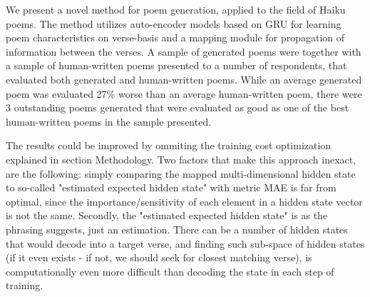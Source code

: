 \documentclass{acm_proc_article-sp}
\begin{document}
We present a novel method for poem generation, applied to the field of Haiku poems. The method utilizes auto-encoder models based on GRU for learning poem characteristics on verse-basis and a mapping module for propagation of information between the verses. A sample of generated poems were together with a sample of human-written poems presented to a number of respondents, that evaluated both generated and human-written poems. While an average generated poem was evaluated 27\% worse than an average human-written poem, there were 3 outstanding poems generated that were evaluated as good as one of the best human-written poems in the sample presented.

The results could be improved by ommiting the training cost optimization explained in section Methodology. Two factors that make this approach inexact, are the following: simply comparing the mapped multi-dimensional hidden state to so-called "estimated expected hidden state" with metric MAE is far from optimal, since the importance/sensitivity of each element in a hidden state vector is not the same. Secondly, the "estimated expected hidden state" is as the phrasing suggests, just an estimation. There can be a number of hidden states that would decode into a target verse, and finding such sub-space of hidden states (if it even exists - if not, we should seek for closest matching verse), is computationally even more difficult than decoding the state in each step of training.




\balancecolumns
\end{document}
